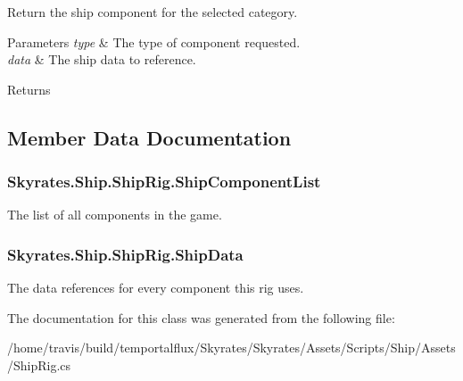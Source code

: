 Return the ship component for the selected category. 


\begin{DoxyParams}{Parameters}
{\em type} & The type of component requested.\\
\hline
{\em data} & The ship data to reference.\\
\hline
\end{DoxyParams}
\begin{DoxyReturn}{Returns}

\end{DoxyReturn}


\subsection{Member Data Documentation}
\hypertarget{class_skyrates_1_1_ship_1_1_ship_rig_a891e9240a636faa382da8de83bb9c929}{
\subsubsection[{Ship\-Component\-List}]{ Skyrates.\-Ship.\-Ship\-Rig.\-Ship\-Component\-List}}\label{class_skyrates_1_1_ship_1_1_ship_rig_a891e9240a636faa382da8de83bb9c929}


The list of all components in the game. 

\hypertarget{class_skyrates_1_1_ship_1_1_ship_rig_acfe3ff90421576ede8e7ca417783130b}{
\subsubsection[{Ship\-Data}]{ Skyrates.\-Ship.\-Ship\-Rig.\-Ship\-Data}}\label{class_skyrates_1_1_ship_1_1_ship_rig_acfe3ff90421576ede8e7ca417783130b}


The data references for every component this rig uses. 



The documentation for this class was generated from the following file\-:\begin{DoxyCompactItemize}
\item 
/home/travis/build/temportalflux/\-Skyrates/\-Skyrates/\-Assets/\-Scripts/\-Ship/\-Assets/Ship\-Rig.\-cs\end{DoxyCompactItemize}
